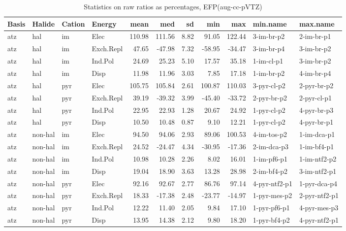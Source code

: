 \documentclass[a4paper]{article}
\begin{document}
\begin{table}[ht]
\centering
\begin{tabular}{llllrrrrrll}
  \hline
Basis & Halide & Cation & Energy & mean & med & sd & min & max & min.name & max.name \\ 
  \hline
atz & hal & im & Elec & 110.98 & 111.56 & 8.82 & 91.05 & 122.44 & 3-im-br-p2 & 2-im-br-p1 \\ 
  atz & hal & im & Exch.Repl & 47.65 & -47.98 & 7.32 & -58.95 & -34.47 & 3-im-br-p4 & 3-im-br-p2 \\ 
  atz & hal & im & Ind.Pol & 24.69 & 25.23 & 5.10 & 17.57 & 35.18 & 1-im-cl-p1 & 3-im-br-p2 \\ 
  atz & hal & im & Disp & 11.98 & 11.96 & 3.03 & 7.85 & 17.18 & 1-im-br-p2 & 4-im-br-p4 \\ 
  atz & hal & pyr & Elec & 105.75 & 105.84 & 2.61 & 100.87 & 110.03 & 3-pyr-cl-p2 & 2-pyr-br-p2 \\ 
  atz & hal & pyr & Exch.Repl & 39.19 & -39.32 & 3.99 & -45.40 & -33.72 & 2-pyr-br-p2 & 2-pyr-cl-p1 \\ 
  atz & hal & pyr & Ind.Pol & 22.95 & 22.93 & 1.28 & 20.67 & 24.92 & 1-pyr-cl-p2 & 4-pyr-br-p3 \\ 
  atz & hal & pyr & Disp & 10.50 & 10.48 & 0.87 & 9.10 & 12.21 & 1-pyr-cl-p2 & 4-pyr-br-p1 \\ 
  atz & non-hal & im & Elec & 94.50 & 94.06 & 2.93 & 89.06 & 100.53 & 4-im-tos-p2 & 1-im-dca-p1 \\ 
  atz & non-hal & im & Exch.Repl & 24.52 & -24.47 & 4.34 & -30.95 & -17.36 & 2-im-dca-p3 & 1-im-bf4-p1 \\ 
  atz & non-hal & im & Ind.Pol & 10.98 & 10.28 & 2.26 & 8.02 & 16.01 & 1-im-pf6-p1 & 1-im-ntf2-p2 \\ 
  atz & non-hal & im & Disp & 19.04 & 18.90 & 3.63 & 13.28 & 28.98 & 2-im-bf4-p2 & 3-im-ntf2-p1 \\ 
  atz & non-hal & pyr & Elec & 92.16 & 92.67 & 2.77 & 86.76 & 97.14 & 4-pyr-ntf2-p1 & 1-pyr-dca-p4 \\ 
  atz & non-hal & pyr & Exch.Repl & 18.33 & -17.38 & 2.48 & -23.77 & -14.97 & 1-pyr-mes-p2 & 2-pyr-ntf2-p1 \\ 
  atz & non-hal & pyr & Ind.Pol & 12.22 & 11.40 & 2.05 & 9.84 & 17.10 & 1-pyr-pf6-p1 & 4-pyr-mes-p3 \\ 
  atz & non-hal & pyr & Disp & 13.95 & 14.38 & 2.12 & 9.80 & 18.20 & 1-pyr-bf4-p2 & 4-pyr-ntf2-p1 \\ 
   \hline
\end{tabular}
\caption{Statistics on raw ratios as percentages, EFP(aug-cc-pVTZ)}
\end{table}
\end{document}
